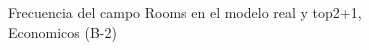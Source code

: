 \begin{figure}[H]
    \centering
    
    \caption{Frecuencia del campo Rooms en el modelo real y top2+1, Economicos (B-2)}
    \label{frecuency-Rooms-top2+1}
\end{figure}